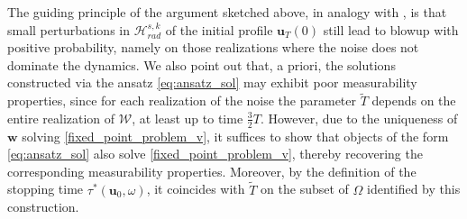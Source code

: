 \documentclass[12pt,reqno]{amsart}
\theoremstyle{plain}
\theoremstyle{remark}
\theoremstyle{plain}
\theoremstyle{definition}
\numberwithin{equation}{section}
\numberwithin{equation}{section}
\newcommand{\HH}{\mathcal{H}}
\begin{document}
	The guiding principle of the argument sketched above, in analogy with \cite{glogic2025globally}, is that small perturbations in $\HH_{rad}^{s,k}$ of the initial profile $\mathbf{u}_{T}(0)$ still lead to blowup with positive probability, namely on those realizations where the noise does not dominate the dynamics. We also point out that, a priori, the solutions constructed via the ansatz \eqref{eq:ansatz_sol} may exhibit poor measurability properties, since for each realization of the noise the parameter $\tilde{T}$ depends on the entire realization of $\mathcal{W}$, at least up to time $\tfrac{3}{2}T$. However, due to the uniqueness of $\mathbf{w}$ solving \eqref{fixed_point_problem_v}, it suffices to show that objects of the form \eqref{eq:ansatz_sol} also solve \eqref{fixed_point_problem_v}, thereby recovering the corresponding measurability properties. Moreover, by the definition of the stopping time $\tau^*(\mathbf{u}_0,\omega)$, it coincides with $\tilde{T}$ on the subset of $\Omega$ identified by this construction.
	
\end{document}
